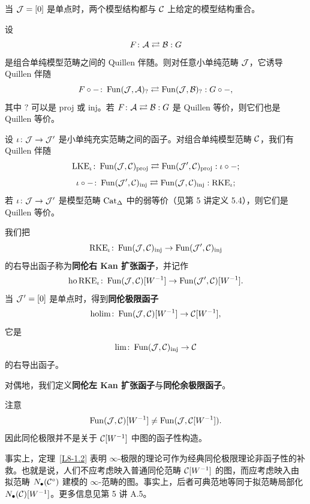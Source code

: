 \begin{example}\label{L8-2.11}
当 $\mathcal{J}=[0]$ 是单点时，两个模型结构都与 $\mathcal{C}$ 上给定的模型结构重合。
\end{example}

\begin{proposition}[HTT.A.3.3.6]\label{L8-2.12}
设
\[
F\colon \mathcal{A}\rightleftarrows \mathcal{B} : G
\]
是组合单纯模型范畴之间的 Quillen 伴随。则对任意小单纯范畴 $\mathcal{J}$，它诱导 Quillen 伴随
\[
F\circ -\colon \operatorname{Fun}(\mathcal{J},\mathcal{A})_{?}\rightleftarrows \operatorname{Fun}(\mathcal{J},\mathcal{B})_{?} : G\circ -,
\]
其中 $?$ 可以是 proj 或 inj。若 $F\colon \mathcal{A}\rightleftarrows \mathcal{B} : G$ 是 Quillen 等价，则它们也是 Quillen 等价。
\end{proposition}

\begin{proposition}[HTT.A.3.3.7, A.3.3.8]\label{L8-2.13}
设 $\iota\colon \mathcal{J}\to\mathcal{J}'$ 是小单纯充实范畴之间的函子。对组合单纯模型范畴 $\mathcal{C}$，我们有 Quillen 伴随
\[
\mathrm{LKE}_{\iota}\colon \operatorname{Fun}(\mathcal{J},\mathcal{C})_{\mathrm{proj}}\rightleftarrows \operatorname{Fun}(\mathcal{J}',\mathcal{C})_{\mathrm{proj}} : \iota\circ -;
\]
\[
\iota\circ -\colon \operatorname{Fun}(\mathcal{J}',\mathcal{C})_{\mathrm{inj}}\rightleftarrows \operatorname{Fun}(\mathcal{J},\mathcal{C})_{\mathrm{inj}} : \mathrm{RKE}_{\iota};
\]
若 $\iota\colon \mathcal{J}\to\mathcal{J}'$ 是模型范畴 $\operatorname{Cat}_\Delta$ 中的弱等价（见第 5 讲定义 5.4），则它们是 Quillen 等价。
\end{proposition}

\begin{definition}\label{L8-2.14}
我们把
\[
\mathrm{RKE}_{\iota}\colon \operatorname{Fun}(\mathcal{J},\mathcal{C})_{\mathrm{inj}}\to \operatorname{Fun}(\mathcal{J}',\mathcal{C})_{\mathrm{inj}}
\]
的右导出函子称为\textbf{同伦右 Kan 扩张函子}，并记作
\[
\operatorname{ho}\mathrm{RKE}_{\iota}\colon \operatorname{Fun}(\mathcal{J},\mathcal{C})[W^{-1}]\to \operatorname{Fun}(\mathcal{J}',\mathcal{C})[W^{-1}].
\]
当 $\mathcal{J}'=[0]$ 是单点时，得到\textbf{同伦极限函子}
\[
\operatorname{holim}\colon \operatorname{Fun}(\mathcal{J},\mathcal{C})[W^{-1}]\to \mathcal{C}[W^{-1}],
\]
它是
\[
\lim\colon \operatorname{Fun}(\mathcal{J},\mathcal{C})_{\mathrm{inj}}\to \mathcal{C}
\]
的右导出函子。

对偶地，我们定义\textbf{同伦左 Kan 扩张函子}与\textbf{同伦余极限函子}。
\end{definition}

\begin{warning}\label{L8-2.15}
注意
\[
\operatorname{Fun}(\mathcal{J},\mathcal{C})[W^{-1}]\neq \operatorname{Fun}(\mathcal{J},\mathcal{C}[W^{-1}]).
\]
因此同伦极限并不是关于 $\mathcal{C}[W^{-1}]$ 中图的函子性构造。
\end{warning}

\begin{remark}\label{L8-2.16}
事实上，定理~\ref{L8-1.2} 表明 $\infty$-极限的理论可作为经典同伦极限理论非函子性的补救。也就是说，人们不应考虑映入普通同伦范畴 $\mathcal{C}[W^{-1}]$ 的图，而应考虑映入由拟范畴 $N_\bullet(\mathcal{C}^{\circ})$ 建模的 $\infty$-范畴的图。事实上，后者可典范地等同于拟范畴局部化 $N_\bullet(\mathcal{C})[W^{-1}]$。更多信息见第 5 讲 A.5。
\end{remark}

